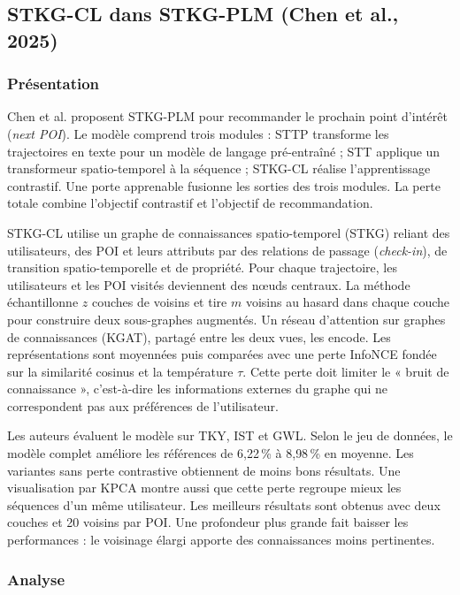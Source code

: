 \documentclass[11pt, french, screen, research-development]{report-rd-info}
\begin{document}
\subsection{STKG-CL dans STKG-PLM (Chen et al., 2025)}

\subsubsection*{Présentation}

 Chen et al. \cite{chen2025stkgplm} proposent STKG-PLM pour recommander le prochain point d'intérêt
(\emph{next POI}).
 Le modèle comprend trois modules : STTP transforme les trajectoires en texte pour un modèle de
langage pré-entraîné ;
 STT applique un transformeur spatio-temporel à la séquence ; STKG-CL réalise l'apprentissage
contrastif.
 Une porte apprenable fusionne les sorties des trois modules. La perte totale combine l'objectif
contrastif et l'objectif de recommandation.

STKG-CL utilise un graphe de connaissances spatio-temporel (STKG) reliant des utilisateurs, 
 des POI et leurs attributs par des relations de passage (\emph{check-in}), de transition
spatio-temporelle et de propriété. Pour chaque trajectoire,
les utilisateurs et les POI visités deviennent des nœuds centraux. 
 La méthode échantillonne $z$ couches de voisins et tire $m$ voisins au hasard dans chaque couche
pour construire deux sous-graphes augmentés.
Un réseau d'attention sur graphes de connaissances (KGAT), partagé entre les deux vues, les encode. 
 Les représentations sont moyennées puis comparées avec une perte InfoNCE fondée sur la similarité
cosinus et la température $\tau$.
 Cette perte doit limiter le « bruit de connaissance », c'est-à-dire les informations externes du
graphe qui ne correspondent pas aux préférences de l'utilisateur.

 Les auteurs évaluent le modèle sur TKY, IST et GWL. Selon le jeu de données, le modèle complet
améliore les références de 6{,}22\,\% à 8{,}98\,\% en moyenne.
Les variantes sans perte contrastive obtiennent de moins bons résultats. 
 Une visualisation par KPCA montre aussi que cette perte regroupe mieux les séquences d'un même
utilisateur.
Les meilleurs résultats sont obtenus avec deux couches et 20 voisins par POI. 
 Une profondeur plus grande fait baisser les performances : le voisinage élargi apporte des
connaissances moins pertinentes.

\subsubsection*{Analyse}
\end{document}
